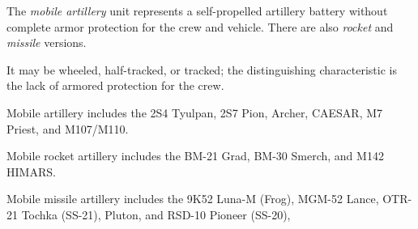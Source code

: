 
The \emph{mobile artillery} unit represents a self-propelled artillery battery without complete armor protection for the crew and vehicle. There are also \emph{rocket} and \emph{missile} versions.

It may be wheeled, half-tracked, or tracked; the distinguishing characteristic is the lack of armored protection for the crew.

Mobile artillery includes
the 
2S4 Tyulpan,
2S7 Pion,
Archer,
CAESAR,
M7 Priest,
and
M107/M110.

Mobile rocket artillery includes the 
BM-21 Grad,
BM-30 Smerch,
and
M142 HIMARS.

Mobile missile artillery includes the 
9K52 Luna-M (Frog), 
MGM-52 Lance, 
OTR-21 Tochka (SS-21), 
Pluton,
and
RSD-10 Pioneer (SS-20), 
